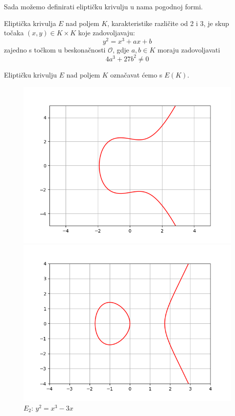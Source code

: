 \documentclass{mathos}
\begin{document}
Sada možemo definirati eliptičku krivulju u nama pogodnoj formi.
\begin{defin}
    \label{elipkriv}
    Eliptička krivulja $E$ nad poljem $K$, karakteristike različite od 2 i 3, je skup točaka $(x, y) \in K \times K$ koje zadovoljavaju:
    \[ y^2 = x^3 + ax + b \]
    zajedno s točkom u beskonačnosti $\mathcal{O}$, gdje $a, b\in K$ moraju zadovoljavati
    \[ 4a^3 + 27b^2 \neq 0 \]
\end{defin}
\begin{nap}
    Eliptičku krivulju $E$ nad poljem $K$ označavat ćemo s $E(K)$.
\end{nap}
\begin{figure}[H]
    \begin{minipage}[c]{0.5\linewidth}
        \centering
        \includegraphics[width=\linewidth,keepaspectratio]{1.png}
        \caption{$E_1$: $y^2 = x^3 -x + 5$}
    \end{minipage}
    \begin{minipage}[c]{0.5\linewidth}
        \centering
        \includegraphics[width=\linewidth,keepaspectratio]{2.png}
        \caption{$E_2$: $y^2 = x^3 -3x$}
    \end{minipage}
\end{figure}
\end{document}
